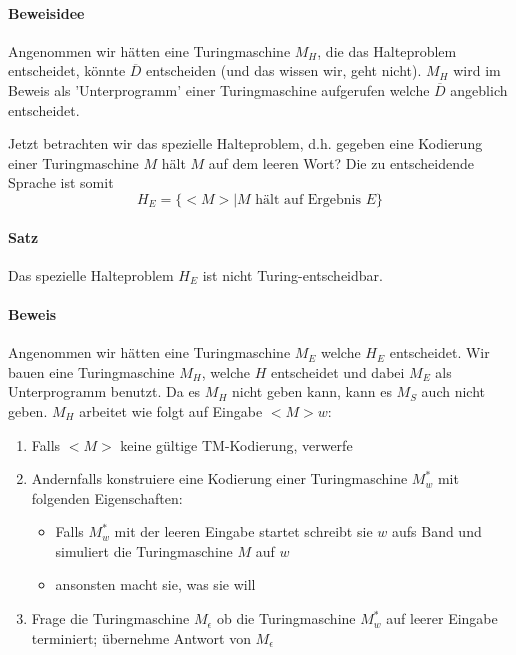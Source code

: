 \paragraph*{Beweisidee} Angenommen wir hätten eine Turingmaschine $M_H$, die das Halteproblem entscheidet, könnte $\overline{D}$ entscheiden (und das wissen wir, geht nicht). $M_H$ wird im Beweis als 'Unterprogramm' einer Turingmaschine aufgerufen welche $\overline{D}$ angeblich entscheidet.

\par\medskip Jetzt betrachten wir das spezielle Halteproblem, d.h. gegeben eine Kodierung einer Turingmaschine $M$
hält $M$ auf dem leeren Wort? Die zu entscheidende Sprache ist somit $$ H_E = \{ <M> | M \text{ hält auf Ergebnis }  E \} $$\par\medskip

\paragraph*{Satz} Das spezielle Halteproblem $H_E$ ist nicht Turing-entscheidbar.

\paragraph*{Beweis} Angenommen wir hätten eine Turingmaschine $M_E$ welche $H_E$ entscheidet. Wir bauen eine Turingmaschine $M_H$, welche $H$ entscheidet und dabei $M_E$ als Unterprogramm benutzt. Da es $M_H$ nicht geben kann, kann es $M_S$ auch nicht geben. $M_H$ arbeitet wie folgt auf Eingabe $<M>w$:
\begin{enumerate}
	\item Falls $<M>$ keine gültige TM-Kodierung, verwerfe
	\item Andernfalls konstruiere eine Kodierung einer Turingmaschine $M_w^*$ mit folgenden Eigenschaften:
	\begin{itemize}
		\item Falls $M_w^*$ mit der leeren Eingabe startet schreibt sie $w$ aufs Band und simuliert die Turingmaschine $M$ auf $w$
		\item ansonsten macht sie, was sie will
	\end{itemize}
	\item Frage die Turingmaschine $M_\epsilon$ ob die Turingmaschine $M_w^*$ auf leerer Eingabe terminiert; übernehme Antwort von $M_\epsilon$
\end{enumerate}

